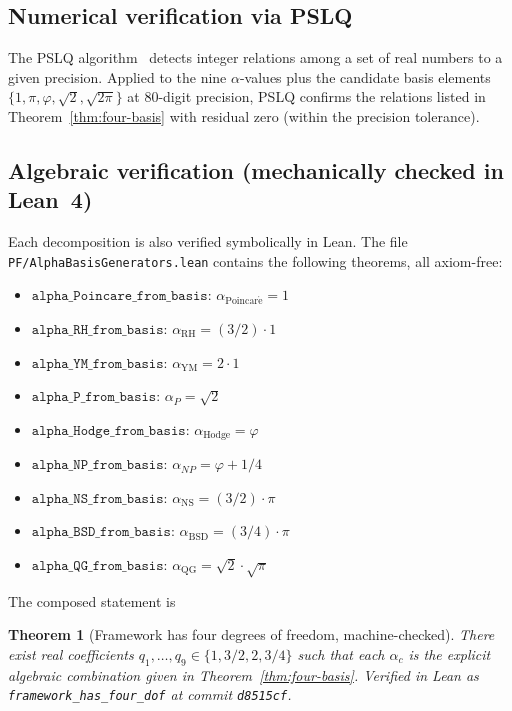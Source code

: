 \documentclass[11pt,a4paper]{article}
\newtheorem{theorem}{Theorem}[section]
\theoremstyle{definition}
\theoremstyle{remark}
\begin{document}
\subsection{Numerical verification via PSLQ}

The PSLQ algorithm~\cite{ferguson1992pslq} detects integer relations
among a set of real numbers to a given precision. Applied to the
nine $\alpha$-values plus the candidate basis elements
$\{1, \pi, \varphi, \sqrt{2}, \sqrt{2\pi}\}$ at $80$-digit precision,
PSLQ confirms the relations listed in Theorem~\ref{thm:four-basis}
with residual zero (within the precision tolerance).

\subsection{Algebraic verification (mechanically checked in Lean~4)}

Each decomposition is also verified symbolically in Lean. The file
\texttt{PF/AlphaBasisGenerators.lean} contains the following theorems,
all axiom-free:

\begin{itemize}
\item $\mathtt{alpha\_Poincare\_from\_basis}$: $\alpha_{\mathrm{Poincar\acute{e}}} = 1$
\item $\mathtt{alpha\_RH\_from\_basis}$: $\alpha_{\mathrm{RH}} = (3/2)\cdot 1$
\item $\mathtt{alpha\_YM\_from\_basis}$: $\alpha_{\mathrm{YM}} = 2 \cdot 1$
\item $\mathtt{alpha\_P\_from\_basis}$: $\alpha_P = \sqrt{2}$
\item $\mathtt{alpha\_Hodge\_from\_basis}$: $\alpha_{\mathrm{Hodge}} = \varphi$
\item $\mathtt{alpha\_NP\_from\_basis}$: $\alpha_{NP} = \varphi + 1/4$
\item $\mathtt{alpha\_NS\_from\_basis}$: $\alpha_{\mathrm{NS}} = (3/2)\cdot \pi$
\item $\mathtt{alpha\_BSD\_from\_basis}$: $\alpha_{\mathrm{BSD}} = (3/4)\cdot \pi$
\item $\mathtt{alpha\_QG\_from\_basis}$: $\alpha_{\mathrm{QG}} = \sqrt{2}\cdot\sqrt{\pi}$
\end{itemize}

The composed statement is

\begin{theorem}[Framework has four degrees of freedom, machine-checked]
\label{thm:four-dof}
There exist real coefficients
$q_1, \ldots, q_9 \in \{1, 3/2, 2, 3/4\}$ such that each
$\alpha_c$ is the explicit algebraic combination given in
Theorem~\ref{thm:four-basis}. Verified in Lean as
\texttt{framework\_has\_four\_dof} at commit \texttt{d8515cf}.
\end{theorem}
\end{document}
